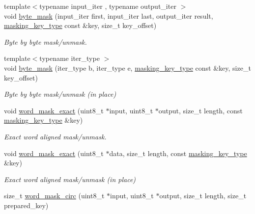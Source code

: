 \begin{DoxyCompactItemize}
{\footnotesize template$<$typename input\+\_\+iter , typename output\+\_\+iter $>$ }\\void \mbox{\hyperlink{namespacewebsocketpp_1_1frame_a417650d76aa2433163942d6a13334a6a}{byte\+\_\+mask}} (input\+\_\+iter first, input\+\_\+iter last, output\+\_\+iter result, \mbox{\hyperlink{unionwebsocketpp_1_1frame_1_1uint32__converter}{masking\+\_\+key\+\_\+type}} const \&key, size\+\_\+t key\+\_\+offset)
\begin{DoxyCompactList}\small\item\em Byte by byte mask/unmask. \end{DoxyCompactList}\item 
{\footnotesize template$<$typename iter\+\_\+type $>$ }\\void \mbox{\hyperlink{namespacewebsocketpp_1_1frame_a57740a0ac6dca6789eb3d020b7f31ed8}{byte\+\_\+mask}} (iter\+\_\+type b, iter\+\_\+type e, \mbox{\hyperlink{unionwebsocketpp_1_1frame_1_1uint32__converter}{masking\+\_\+key\+\_\+type}} const \&key, size\+\_\+t key\+\_\+offset)
\begin{DoxyCompactList}\small\item\em Byte by byte mask/unmask (in place) \end{DoxyCompactList}\item 
void \mbox{\hyperlink{namespacewebsocketpp_1_1frame_acb2ccda66981a8a12a3b97fb4b179aa3}{word\+\_\+mask\+\_\+exact}} (uint8\+\_\+t $\ast$input, uint8\+\_\+t $\ast$output, size\+\_\+t length, const \mbox{\hyperlink{unionwebsocketpp_1_1frame_1_1uint32__converter}{masking\+\_\+key\+\_\+type}} \&key)
\begin{DoxyCompactList}\small\item\em Exact word aligned mask/unmask. \end{DoxyCompactList}\item 
void \mbox{\hyperlink{namespacewebsocketpp_1_1frame_ab5cb468072d1f3f4b430eb2e0baff69d}{word\+\_\+mask\+\_\+exact}} (uint8\+\_\+t $\ast$data, size\+\_\+t length, const \mbox{\hyperlink{unionwebsocketpp_1_1frame_1_1uint32__converter}{masking\+\_\+key\+\_\+type}} \&key)
\begin{DoxyCompactList}\small\item\em Exact word aligned mask/unmask (in place) \end{DoxyCompactList}\item 
size\+\_\+t \mbox{\hyperlink{namespacewebsocketpp_1_1frame_aa3458068f08acb26e350e39375265085}{word\+\_\+mask\+\_\+circ}} (uint8\+\_\+t $\ast$input, uint8\+\_\+t $\ast$output, size\+\_\+t length, size\+\_\+t prepared\+\_\+key)

\end{DoxyCompactItemize}
